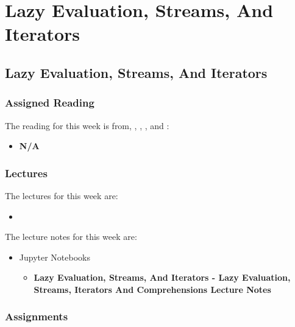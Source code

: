 \clearpage

\renewcommand{\ChapTitle}{Lazy Evaluation, Streams, And Iterators}
\renewcommand{\SectionTitle}{Lazy Evaluation, Streams, And Iterators}

\chapter{\ChapTitle}

\section{\SectionTitle}

\subsection{Assigned Reading}

The reading for this week is from, \AtomicScalaBook, \EssOfPPLBook, \FuncOfPPLBook, and \ProgInScalaBook:

\begin{itemize}
    \item \textbf{N/A}
\end{itemize}

\subsection{Lectures}

The lectures for this week are:

\begin{itemize}
    \item {}
\end{itemize}

\noindent The lecture notes for this week are:

\begin{itemize}
    \item Jupyter Notebooks
    \begin{itemize}
        \item \textbf{Lazy Evaluation, Streams, And Iterators - Lazy Evaluation, Streams, Iterators And Comprehensions Lecture Notes}
    \end{itemize}
\end{itemize}

\subsection{Assignments}

